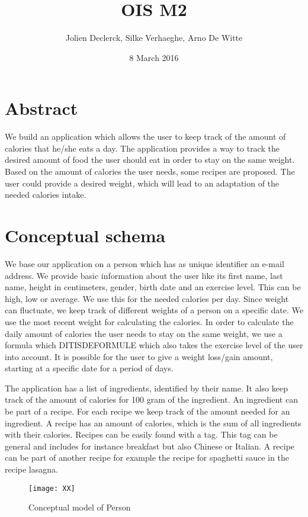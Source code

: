 \documentclass{article}
\title{OIS M2}
\author{Jolien Declerck, Silke Verhaeghe, Arno De Witte}
\date{8 March 2016}
\begin{document}
\maketitle

\section{Abstract}
We build an application which allows the user to keep track of the amount of calories that he/she eats a day.  The application provides a way to track the desired amount of food the user should eat in order to stay on the same weight. Based on the amount of calories the user needs, some recipes are proposed. The user could provide a desired weight, which will lead to an adaptation of the needed calories intake.


\section{Conceptual schema}
We base our application on a person which has as unique identifier an e-mail address. We provide basic information about the user like its first name, last name, height in centimeters, gender, birth date and an exercise level. This can be high, low or average. We use this for the needed calories per day. Since weight can fluctuate, we keep track of different weights of a person on a specific date. We use the most recent weight for calculating the calories. In order to calculate the daily amount of calories the user needs to stay on the same weight, we use a formula which DITISDEFORMULE which also takes the exercise level of the user into account. It is possible for the user to give a weight loss/gain amount, starting at a specific date for a period of days. 

The application has a list of ingredients, identified by their name. It also keep track of the amount of calories for 100 gram of the ingredient. An ingredient can be part of a recipe. For each recipe we keep track of the amount needed for an ingredient. A recipe has an amount of calories, which is the sum of all ingredients with their calories. Recipes can be easily found with a tag. This tag can be general and includes for instance breakfast but also Chinese or Italian. A recipe can be part of another recipe for example the recipe for spaghetti sauce in the recipe lasagna.  
\begin{figure}[H]
\centering
\texttt{[image: XX]}
\caption{Conceptual model of Person}
\end{figure}
\end{document}
